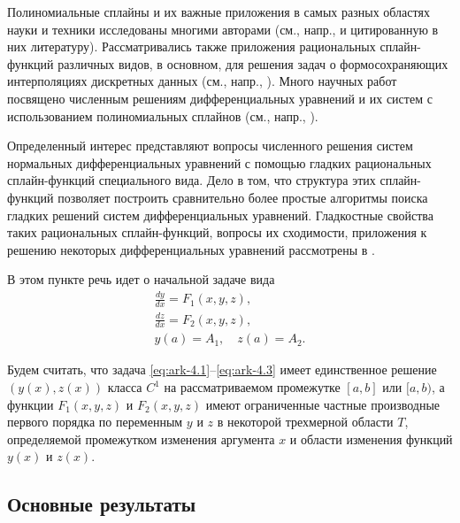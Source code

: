 Полиномиальные сплайны и их важные приложения в самых разных областях науки и
техники исследованы многими авторами (см., напр., \cite{bib:ark-14,bib:ark-15,bib:ark-16} и цитированную в них
литературу).
Рассматривались также приложения рациональных сплайн-функций различных видов,
в основном, для решения задач о формосохраняющих интерполяциях дискретных данных
(см., напр., \cite{bib:ark-16,bib:ark-17,bib:ark-18}).
Много научных работ посвящено численным решениям дифференциальных уравнений и
их систем с использованием полиномиальных сплайнов (см., напр., \cite{bib:ark-14,bib:ark-15,bib:ark-16}).

Определенный интерес представляют вопросы численного решения систем нормальных
дифференциальных уравнений с помощью гладких рациональных сплайн-функций специального
вида. Дело в том, что структура этих сплайн-функций позволяет построить сравнительно
более простые алгоритмы поиска гладких решений систем дифференциальных уравнений.
Гладкостные свойства таких рациональных сплайн-функций, вопросы их сходимости,
приложения к решению некоторых
дифференциальных уравнений рассмотрены в \cite{bib:ark-11,bib:ark-12,bib:ark-13}.

В этом пункте речь идет о начальной задаче вида
\begin{gather}\label{eq:ark-4.1}
\frac{dy}{dx}=F_1(x,y,z),
\\\label{eq:ark-4.2}
\frac{dz}{dx}=F_2(x,y,z),
\\\label{eq:ark-4.3}
y(a)=A_1,\quad z(a)=A_2.
\end{gather}

Будем считать, что задача \eqref{eq:ark-4.1}--\eqref{eq:ark-4.3} имеет единственное решение
$(y(x), z(x))$ класса $C^1$ на рассматриваемом промежутке $[a,b]$ или
$[a,b)$, а функции $F_1(x,y,z)$ и $F_2(x,y,z)$ имеют ограниченные частные
 производные первого порядка по переменным $y$ и $z$ в некоторой трехмерной
области $T$, определяемой промежутком изменения аргумента $x$ и области
изменения функций $y(x)$ и $z(x)$.

\subsection{Основные результаты}

